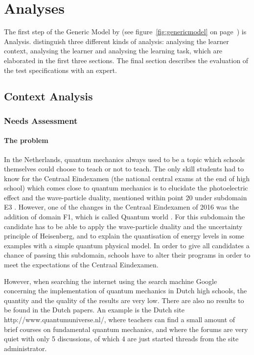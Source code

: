 \documentclass[11pt,twoside]{report} %
\begin{document}
\chapter{Analyses}
\thispagestyle{fancy}

The first step of the Generic Model by  (see figure~\ref{fig:genericmodel} on page~\pageref{fig:genericmodel}) is Analysis.  distinguish three different kinds of analysis: analysing the learner context, analysing the learner and analysing the learning task, which are elaborated in the first three sections. The final section describes the evaluation of the test specifications with an expert.


\section{Context Analysis}


\subsection{Needs Assessment}

\subsubsection{The problem}
\label{sssec:problem}

In the Netherlands, quantum mechanics always used to be a topic which schools themselves could choose to teach or not to teach. The only skill students had to know for the Centraal Eindexamen (the national central exams at the end of high school) which comes close to quantum mechanics is to elucidate the photoelectric effect and the wave-particle duality, mentioned within point 20 under subdomain E3 \cite{eindexamen2015}. However, one of the changes in the Centraal Eindexamen of 2016 was the addition of domain F1, which is called Quantum world \cite{eindexamen2016}. For this subdomain the candidate has to be able to apply the wave-particle duality and the uncertainty principle of Heisenberg, and to explain the quantisation of energy levels in some examples with a simple quantum physical model. In order to give all candidates a chance of passing this subdomain, schools have to alter their programs in order to meet the expectations of the Centraal Eindexamen.

However, when searching the internet using the search machine Google concerning the implementation of quantum mechanics in Dutch high schools, the quantity and the quality of the results are very low. There are also no results to be found in the Dutch papers. An example is the Dutch site http://www.quantumuniverse.nl/, where teachers can find a small amount of brief courses on fundamental quantum mechanics, and where the forums are very quiet with only 5 discussions, of which 4 are just started threads from the site administrator.
\end{document}
